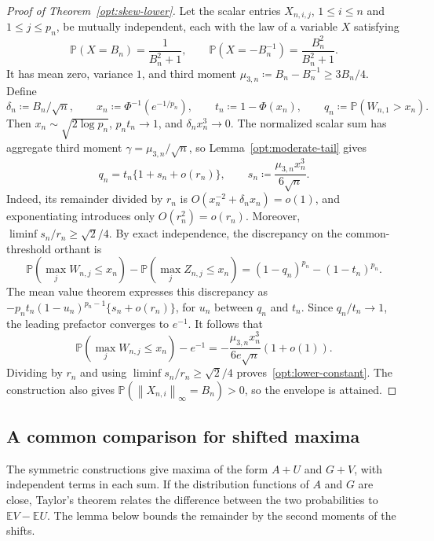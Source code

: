 \documentclass[11pt,letterpaper]{article}
\theoremstyle{remark}
\newcommand{\E}{\mathbb E}
\newcommand{\Pp}{\mathbb P}
\newcommand{\norm}[1]{\left\lVert#1\right\rVert}
\begin{document}
\begin{proof}[Proof of Theorem~\ref{opt:skew-lower}]
Let the scalar entries \(X_{n,i,j}\), \(1\le i\le n\) and
\(1\le j\le p_n\), be mutually independent, each with the law of a
variable \(X\) satisfying
\begin{equation}
 \Pp(X=B_n)=\frac1{B_n^2+1},\qquad
 \Pp(X=-B_n^{-1})=\frac{B_n^2}{B_n^2+1}.
 \label{opt:two-point-law}
\end{equation}
It has mean zero, variance \(1\), and third moment
\(\mu_{3,n}\coloneqq B_n-B_n^{-1}\ge3B_n/4\). {Define}
\[
 \delta_n\coloneqq B_n/\sqrt n,\qquad
 x_n\coloneqq\Phi^{-1}(e^{-1/p_n}),\qquad
 t_n\coloneqq1-\Phi(x_n),\qquad q_n\coloneqq\Pp(W_{n,1}>x_n).
\]
Then \(x_n\sim\sqrt{2\log p_n}\), \(p_nt_n\to1\), and
\(\delta_nx_n^3\to0\). The normalized scalar sum has aggregate
third moment \(\gamma=\mu_{3,n}/\sqrt n\), so
Lemma~\ref{opt:moderate-tail} gives
\begin{equation}
 q_n=t_n\{1+s_n+o(r_n)\},\qquad
 s_n\coloneqq\frac{\mu_{3,n}x_n^3}{6\sqrt n}.
 \label{opt:tail-linearization}
\end{equation}
Indeed, its remainder divided by \(r_n\) is
\(O(x_n^{-2}+\delta_nx_n)=o(1)\), and exponentiating introduces only
\(O(r_n^2)=o(r_n)\). Moreover,
\(\liminf s_n/r_n\ge\sqrt2/4\).
By exact independence, the discrepancy on the common-threshold orthant is
\[
 \Pp(\max_jW_{n,j}\le x_n)-\Pp(\max_jZ_{n,j}\le x_n)
 =(1-q_n)^{p_n}-(1-t_n)^{p_n}.
\]
The mean value theorem expresses this discrepancy as
\(-p_nt_n(1-u_n)^{p_n-1}\{s_n+o(r_n)\}\), for \(u_n\) between
\(q_n\) and \(t_n\). Since \(q_n/t_n\to1\), the leading prefactor
converges to \(e^{-1}\). It follows that
\begin{equation}
 \Pp(\max_jW_{n,j}\le x_n)-e^{-1}
 =-\frac{\mu_{3,n}x_n^3}{6e\sqrt n}(1+o(1)).
 \label{opt:exact-product-asymptotic}
\end{equation}
Dividing by \(r_n\) and using
\(\liminf s_n/r_n\ge\sqrt2/4\) proves~\eqref{opt:lower-constant}.
The construction also gives
\(\Pp(\norm{X_{n,i}}_\infty=B_n)>0\), so the envelope is attained.
\end{proof}

\subsection{A common comparison for shifted maxima}
\label{app:lower-comparison}

The symmetric constructions give maxima of the form \(A+U\) and
\(G+V\), with independent terms in each sum. If the distribution
functions of \(A\) and \(G\) are close, Taylor's theorem relates the
difference between the two probabilities to \(\E V-\E U\).
The lemma below bounds the remainder by the second moments of the shifts.
\end{document}
